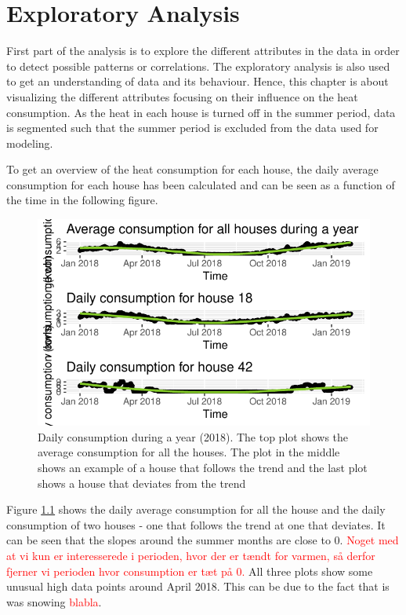 \chapter{Exploratory Analysis}
First part of the analysis is to explore the different attributes in the data in order to detect possible patterns or correlations. The exploratory analysis is also used to get an understanding of data and its behaviour. Hence, this chapter is about visualizing the different attributes focusing on their influence on the heat consumption. As the heat in each house is turned off in the summer period, data is segmented such that the summer period is excluded from the data used for modeling. 

\noindent To get an overview of the heat consumption for each house, the daily average consumption for each house has been calculated and can be seen as a function of the time in the following figure. 
\begin{figure}[H]
    \centering
    \includegraphics[width=.75\textwidth]{../../../figures/daily_cons.pdf}
    \caption{Daily consumption during a year (2018). The top plot shows the average consumption for all the houses. The plot in the middle shows an example of a house that follows the trend and the last plot shows a house that deviates from the trend}
    \label{fig: daily_cons}
\end{figure}
Figure \ref{fig: daily_cons} shows the daily average consumption for all the house and the daily consumption of two houses - one that follows the trend at one that deviates. It can be seen that the slopes around the summer months are close to 0. \textcolor{red}{Noget med at vi kun er interesserede i perioden, hvor der er tændt for varmen, så derfor fjerner vi perioden hvor consumption er tæt på 0.} All three plots show some unusual high data points around April 2018. This can be due to the fact that is was snowing \textcolor{red}{blabla}. \\

